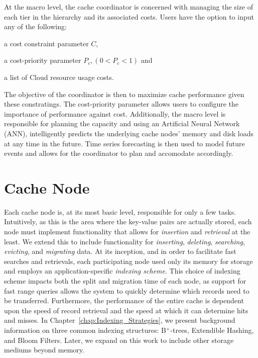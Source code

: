At the macro level, the cache coordinator is concerned with managing the size
of each tier in the hierarchy and its associated costs. Users have the option
to input any of the following:
\begin{inparaenum}[(1)]
  \item a cost constraint parameter $C$,
  \item a cost-priority parameter $P_c, (0 < P_c < 1)$ and
  \item a list of Cloud resource usage costs.
\end{inparaenum}
The objective of the coordinator is then to maximize cache performance given
these constratings. The cost-priority parameter allows users to configure the
importance of performance against cost. Additionally, the macro level is
responsible for planning the capacity and using an Artificial Neural Network
(ANN), intelligently predicts the underlying cache nodes' memory and disk loads
at any time in the future. Time series forecasting is then used to model future
events and allows for the coordinator to plan and accomodate accordingly.


\section{Cache Node} %
\label{sec:Cache_Node}
Each cache node is, at its most basic level, responsible for only a few tasks.
Intuitively, as this is the area where the key-value pairs are actually stored,
each node must implement functionality that allows for \emph{insertion} and
\emph{retrieval} at the least. We extend this to include functionality for
\emph{inserting}, \emph{deleting}, \emph{searching}, \emph{evicting}, and
\emph{migrating} data. At its inception, and in order to facilitate fast
searches and retrievals, each participating node used only its memory for
storage and employs an application-specific \emph{indexing scheme}. This choice
of indexing scheme impacts both the split and migration time of each node, as
support for fast range queries allows the system to quickly determine which
records need to be transferred. Furthermore, the performance of the entire
cache is dependent upon the speed of record retrieval and the speed at which it
can determine hits and misses. In Chapter~\ref{chap:Indexing_Strategies}, we
present background information on three common indexing structures:
B$^+$-trees, Extendible Hashing, and Bloom Filters. Later, we expand on this
work to include other storage mediums beyond memory.

